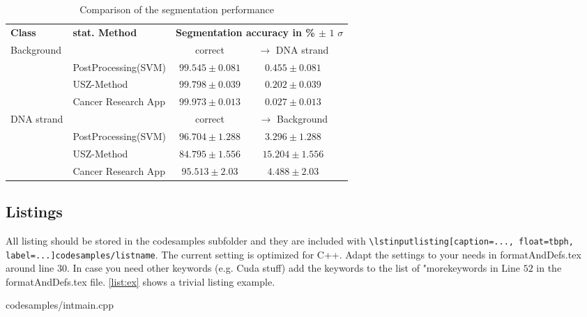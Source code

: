 \begin{table}
	\centering
	\caption{Comparison of the segmentation performance}
	\label{tab:ex}
	\begin{tabular}{l l c c c}
		\toprule

		\textbf{Class} & \textbf{stat. Method} \hspace{0.6cm} & \multicolumn{3}{l}{\textbf{Segmentation accuracy in \% $\pm \text{ 1 } \sigma$}}\\
		\cmidrule{1-5}
		Background &  & correct & $\rightarrow$ DNA strand \\ 
		\cmidrule{3-5}
			 & PostProcessing(SVM) 	& $ 99.545 \pm 0.081 $ & $ 0.455 \pm 0.081 $ \\
			 & USZ-Method			& $ 99.798 \pm 0.039 $ & $ 0.202 \pm 0.039 $ \\
			 & Cancer Research App	& $ 99.973 \pm 0.013 $ & $ 0.027 \pm 0.013 $ \\

		\cmidrule{1-5}
		DNA strand &  & correct & $\rightarrow$ Background \\ 
		\cmidrule{3-5}
			 & PostProcessing(SVM) 	& $ 96.704 \pm 1.288 $ & $ 3.296 \pm 1.288 $ \\
			 & USZ-Method			& $ 84.795 \pm 1.556 $ & $ 15.204 \pm 1.556 $ \\
			 & Cancer Research App	& $ 95.513 \pm 2.03 $ & $ 4.488 \pm 2.03 $ \\

		\bottomrule
	\end{tabular}
\end{table}


\subsection{Listings}
All listing should be stored in the codesamples subfolder and they are included with \texttt{\textbackslash lstinputlisting[caption=..., float=tbph, label=...]{codesamples/listname}}. The current setting is optimized for C++. Adapt the settings to your needs in formatAndDefs.tex around line $30$. In case you need other keywords (e.g. Cuda stuff) add the keywords to the list of "morekeywords in Line $52$ in the formatAndDefs.tex file. \autoref{list:ex} shows a trivial listing example.

 {codesamples/intmain.cpp}

